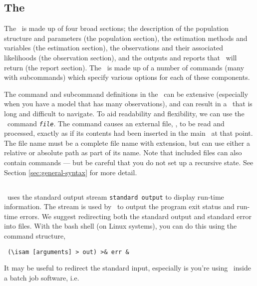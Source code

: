 \subsection{The \config\label{sec:config-files}}
\CH
The \config\ is made up of four broad sections; the description of the population structure and parameters (the population section), the estimation methods and variables (the estimation section), the observations and their associated likelihoods (the observation section), and the outputs and reports that \iSAM\ will return (the report section). The \config\ is made up of a number of commands (many with subcommands) which specify various options for each of these components.

The command and subcommand definitions in the \config\ can be extensive (especially when you have a model that has many observations), and can result in a \config\ that is long and difficult to navigate. To aid readability and flexibility, we can use the \config\ command  \texttt{\emph{file}}. The command causes an external file, , to be read and processed, exactly as if its contents had been inserted in the main \config\ at that point. The file name must be a complete file name with extension, but can use either a relative or absolute path as part of its name. Note that included files can also contain  commands --- but be careful that you do not set up a recursive state. See Section \ref{sec:general-syntax} for more detail.

\subsection{\label{sec:redirecting-stdout}}
\CH
\iSAM\ uses the standard output stream \texttt{standard output} to display run-time information. The  stream is used by \iSAM\ to output the program exit status and run-time errors. We suggest redirecting both the standard output and standard error into files. With the bash shell (on Linux systems), you can do this using the command structure,

\begin{verbatim} (\isam [arguments] > out) >& err &\end{verbatim}

It may be useful to redirect the standard input, especially is you're using \iSAM\ inside a batch job software, i.e. 

